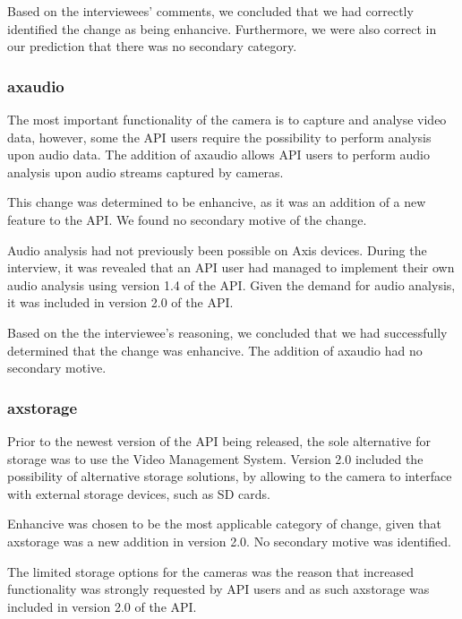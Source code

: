 \documentclass{sig-alternate}
\begin{document}
Based on the interviewees' comments, we concluded that we had correctly identified the change as being enhancive. Furthermore, we were also correct in our prediction that there was no secondary category. 

\subsubsection{axaudio}

The most important functionality of the camera is to capture and analyse video data, however, some the API users require the possibility to perform analysis upon audio data. The addition of axaudio allows API users to perform audio analysis upon audio streams captured by cameras. 

This change was determined to be enhancive, as it was an addition of a new feature to the API. We found no secondary motive of the change. 


Audio analysis had not previously been possible on Axis devices. During the interview, it was revealed that an API user had managed to implement their own audio analysis using version 1.4 of the API. Given the demand for audio analysis, it was included in version 2.0 of the API.

Based on the the interviewee's reasoning, we concluded that we had successfully determined that the change was enhancive. The addition of axaudio had no secondary motive. 

\subsubsection{axstorage}

Prior to the newest version of the API being released, the sole alternative for storage was to use the Video Management System. Version 2.0 included the possibility of alternative storage solutions, by allowing to the camera to interface with external storage devices, such as SD cards. 

Enhancive was chosen to be the most applicable category of change, given that axstorage was a new addition in version 2.0. No secondary motive was identified. 

The limited storage options for the cameras was the reason that increased functionality was strongly requested by API users and as such axstorage was included in version 2.0 of the API.
\end{document}
